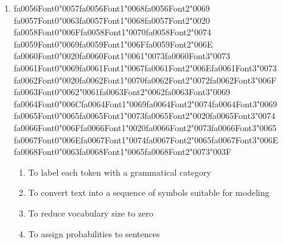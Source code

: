 \documentclass[12pt]{article}
\begin{document}
\begin{enumerate}[label=Q\arabic*.]
\begin{enumerate}[label=(\Alph*)]
\end{enumerate}
\item {\csname fa0056Font0\endcsname\char"0057}{\csname fa0056Font1\endcsname\char"0068}{\csname fa0056Font2\endcsname\char"0069} {\csname fa0057Font0\endcsname\char"0063}{\csname fa0057Font1\endcsname\char"0068}{\csname fa0057Font2\endcsname\char"0020} {\csname fa0058Font0\endcsname\char"006F}{\csname fa0058Font1\endcsname\char"0070}{\csname fa0058Font2\endcsname\char"0074} {\csname fa0059Font0\endcsname\char"0069}{\csname fa0059Font1\endcsname\char"006F}{\csname fa0059Font2\endcsname\char"006E} {\csname fa0060Font0\endcsname\char"0020}{\csname fa0060Font1\endcsname\char"0061}{\char"0073}{\csname fa0060Font3\endcsname\char"0073} {\csname fa0061Font0\endcsname\char"0069}{\csname fa0061Font1\endcsname\char"0067}{\csname fa0061Font2\endcsname\char"006E}{\csname fa0061Font3\endcsname\char"0073} {\csname fa0062Font0\endcsname\char"0020}{\csname fa0062Font1\endcsname\char"0070}{\csname fa0062Font2\endcsname\char"0072}{\csname fa0062Font3\endcsname\char"006F} {\csname fa0063Font0\endcsname\char"0062}{\char"0061}{\csname fa0063Font2\endcsname\char"0062}{\csname fa0063Font3\endcsname\char"0069} {\csname fa0064Font0\endcsname\char"006C}{\csname fa0064Font1\endcsname\char"0069}{\csname fa0064Font2\endcsname\char"0074}{\csname fa0064Font3\endcsname\char"0069} {\csname fa0065Font0\endcsname\char"0065}{\csname fa0065Font1\endcsname\char"0073}{\csname fa0065Font2\endcsname\char"0020}{\csname fa0065Font3\endcsname\char"0074} {\csname fa0066Font0\endcsname\char"006F}{\csname fa0066Font1\endcsname\char"0020}{\csname fa0066Font2\endcsname\char"0073}{\csname fa0066Font3\endcsname\char"0065} {\csname fa0067Font0\endcsname\char"006E}{\csname fa0067Font1\endcsname\char"0074}{\csname fa0067Font2\endcsname\char"0065}{\csname fa0067Font3\endcsname\char"006E} {\csname fa0068Font0\endcsname\char"0063}{\csname fa0068Font1\endcsname\char"0065}{\csname fa0068Font2\endcsname\char"0073}{\char"003F}
\begin{enumerate}[label=(\Alph*)]
    \item To label each token with a grammatical category
    \item To convert text into a sequence of symbols suitable for modeling
    \item To reduce vocabulary size to zero
    \item To assign probabilities to sentences
\end{enumerate}

\end{enumerate}
\end{document}
